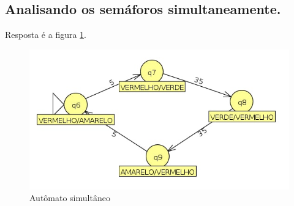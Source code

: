 \documentclass[11pt]{article}
\begin{document}
\subsection{Analisando os semáforos simultaneamente.}
\label{sec:org2341586}

Resposta é a figura \ref{fig:org18b0031}.
\begin{figure}[htbp]
\centering
\includegraphics[width=.9\linewidth]{./q7/simultaneo.jpg}
\caption{\label{fig:org18b0031}
Autômato simultâneo}
\end{figure}
\end{document}
